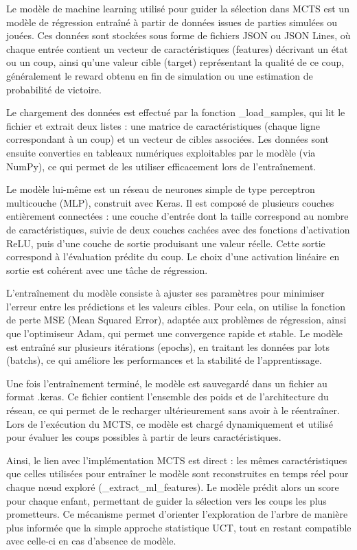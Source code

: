 \documentclass[11pt]{article}
\begin{document}
Le modèle de machine learning utilisé pour guider la sélection dans MCTS est un modèle de régression entraîné à partir de données issues de parties simulées ou jouées. Ces données sont stockées sous forme de fichiers JSON ou JSON Lines, où chaque entrée contient un vecteur de caractéristiques (features) décrivant un état ou un coup, ainsi qu’une valeur cible (target) représentant la qualité de ce coup, généralement le reward obtenu en fin de simulation ou une estimation de probabilité de victoire.

Le chargement des données est effectué par la fonction \_load\_samples, qui lit le fichier et extrait deux listes : une matrice de caractéristiques (chaque ligne correspondant à un coup) et un vecteur de cibles associées. Les données sont ensuite converties en tableaux numériques exploitables par le modèle (via NumPy), ce qui permet de les utiliser efficacement lors de l’entraînement.

Le modèle lui-même est un réseau de neurones simple de type perceptron multicouche (MLP), construit avec Keras. Il est composé de plusieurs couches entièrement connectées : une couche d’entrée dont la taille correspond au nombre de caractéristiques, suivie de deux couches cachées avec des fonctions d’activation ReLU, puis d’une couche de sortie produisant une valeur réelle. Cette sortie correspond à l’évaluation prédite du coup. Le choix d’une activation linéaire en sortie est cohérent avec une tâche de régression.

L’entraînement du modèle consiste à ajuster ses paramètres pour minimiser l’erreur entre les prédictions et les valeurs cibles. Pour cela, on utilise la fonction de perte MSE (Mean Squared Error), adaptée aux problèmes de régression, ainsi que l’optimiseur Adam, qui permet une convergence rapide et stable. Le modèle est entraîné sur plusieurs itérations (epochs), en traitant les données par lots (batchs), ce qui améliore les performances et la stabilité de l’apprentissage.

Une fois l’entraînement terminé, le modèle est sauvegardé dans un fichier au format .keras. Ce fichier contient l’ensemble des poids et de l’architecture du réseau, ce qui permet de le recharger ultérieurement sans avoir à le réentraîner. Lors de l’exécution du MCTS, ce modèle est chargé dynamiquement et utilisé pour évaluer les coups possibles à partir de leurs caractéristiques.

Ainsi, le lien avec l’implémentation MCTS est direct : les mêmes caractéristiques que celles utilisées pour entraîner le modèle sont reconstruites en temps réel pour chaque nœud exploré (\_extract\_ml\_features). Le modèle prédit alors un score pour chaque enfant, permettant de guider la sélection vers les coups les plus prometteurs. Ce mécanisme permet d’orienter l’exploration de l’arbre de manière plus informée que la simple approche statistique UCT, tout en restant compatible avec celle-ci en cas d’absence de modèle.
\end{document}
